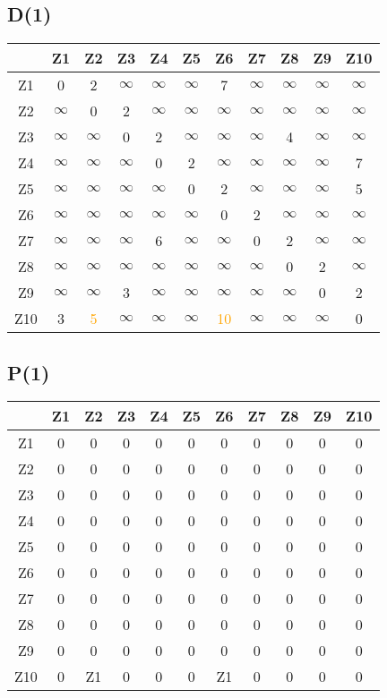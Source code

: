 \documentclass[a4paper,11pt]{article}
\begin{document}
\subsection*{D(1)}
\begin{center}
\begin{tabular}{c|cccccccccc}
 & Z1 & Z2 & Z3 & Z4 & Z5 & Z6 & Z7 & Z8 & Z9 & Z10 \\ \hline
Z1 & 0 & 2 & $\infty$ & $\infty$ & $\infty$ & 7 & $\infty$ & $\infty$ & $\infty$ & $\infty$ \\
Z2 & $\infty$ & 0 & 2 & $\infty$ & $\infty$ & $\infty$ & $\infty$ & $\infty$ & $\infty$ & $\infty$ \\
Z3 & $\infty$ & $\infty$ & 0 & 2 & $\infty$ & $\infty$ & $\infty$ & 4 & $\infty$ & $\infty$ \\
Z4 & $\infty$ & $\infty$ & $\infty$ & 0 & 2 & $\infty$ & $\infty$ & $\infty$ & $\infty$ & 7 \\
Z5 & $\infty$ & $\infty$ & $\infty$ & $\infty$ & 0 & 2 & $\infty$ & $\infty$ & $\infty$ & 5 \\
Z6 & $\infty$ & $\infty$ & $\infty$ & $\infty$ & $\infty$ & 0 & 2 & $\infty$ & $\infty$ & $\infty$ \\
Z7 & $\infty$ & $\infty$ & $\infty$ & 6 & $\infty$ & $\infty$ & 0 & 2 & $\infty$ & $\infty$ \\
Z8 & $\infty$ & $\infty$ & $\infty$ & $\infty$ & $\infty$ & $\infty$ & $\infty$ & 0 & 2 & $\infty$ \\
Z9 & $\infty$ & $\infty$ & 3 & $\infty$ & $\infty$ & $\infty$ & $\infty$ & $\infty$ & 0 & 2 \\
Z10 & 3 & \textcolor{orange}{5} & $\infty$ & $\infty$ & $\infty$ & \textcolor{orange}{10} & $\infty$ & $\infty$ & $\infty$ & 0 \\
\end{tabular}
\end{center}
\subsection*{P(1)}
\begin{center}
\begin{tabular}{c|cccccccccc}
 & Z1 & Z2 & Z3 & Z4 & Z5 & Z6 & Z7 & Z8 & Z9 & Z10 \\ \hline
Z1 & 0 & 0 & 0 & 0 & 0 & 0 & 0 & 0 & 0 & 0 \\
Z2 & 0 & 0 & 0 & 0 & 0 & 0 & 0 & 0 & 0 & 0 \\
Z3 & 0 & 0 & 0 & 0 & 0 & 0 & 0 & 0 & 0 & 0 \\
Z4 & 0 & 0 & 0 & 0 & 0 & 0 & 0 & 0 & 0 & 0 \\
Z5 & 0 & 0 & 0 & 0 & 0 & 0 & 0 & 0 & 0 & 0 \\
Z6 & 0 & 0 & 0 & 0 & 0 & 0 & 0 & 0 & 0 & 0 \\
Z7 & 0 & 0 & 0 & 0 & 0 & 0 & 0 & 0 & 0 & 0 \\
Z8 & 0 & 0 & 0 & 0 & 0 & 0 & 0 & 0 & 0 & 0 \\
Z9 & 0 & 0 & 0 & 0 & 0 & 0 & 0 & 0 & 0 & 0 \\
Z10 & 0 & Z1 & 0 & 0 & 0 & Z1 & 0 & 0 & 0 & 0 \\
\end{tabular}
\end{center}
\newpage
\end{document}
